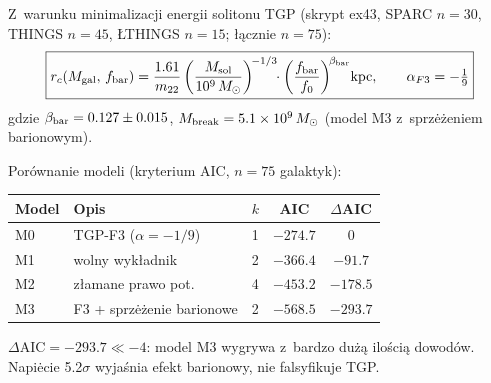 \begin{proposition}\label{prop:K18-soliton}
Z~warunku minimalizacji energii solitonu TGP (skrypt ex43, SPARC $n=30$,
THINGS $n=45$, \L{}THINGS $n=15$; \l{}\k{a}cznie $n=75$):
\begin{equation}\label{eq:rc-K18}
  \boxed{
    r_c(M_{\rm gal},\,f_{\rm bar}) =
    \frac{1.61}{m_{22}}
    \left(\frac{M_{\rm sol}}{10^9\,M_\odot}\right)^{\!-1/3}
    \!\!\cdot\left(\frac{f_{\rm bar}}{f_0}\right)^{\!\beta_{\rm bar}}\!
    \mathrm{kpc},
    \qquad
    \alpha_{F3} = -\tfrac{1}{9}
  }
\end{equation}
gdzie $\beta_{\rm bar} = 0.127 \pm 0.015$, $M_{\rm break} =
5.1\times10^9\,M_\odot$ (model M3 z~sprz\.e\.zeniem barionowym).

Por\'ownanie modeli (kryterium AIC, $n = 75$ galaktyk):
\begin{center}
\begin{tabular}{llccc}
\toprule
  Model & Opis & $k$ & AIC & $\Delta$AIC \\
\midrule
  M0 & TGP-F3 ($\alpha=-1/9$) & 1 & $-274.7$ & $0$ \\
  M1 & wolny wyk\l{}adnik & 2 & $-366.4$ & $-91.7$ \\
  M2 & z\l{}amane prawo pot. & 4 & $-453.2$ & $-178.5$ \\
  M3 & F3 + sprz\.e\.zenie barionowe & 2 & $\mathbf{-568.5}$ &
    $\mathbf{-293.7}$ \\
\bottomrule
\end{tabular}
\end{center}
$\Delta\mathrm{AIC} = -293.7 \ll -4$: model M3 wygrywa z~bardzo du\.z\k{a}
ilo\'sci\k{a} dowod\'ow. Napi\.ecie 5.2$\sigma$ wyja\'snia efekt barionowy,
nie falsyfikuje TGP.
\end{proposition}

